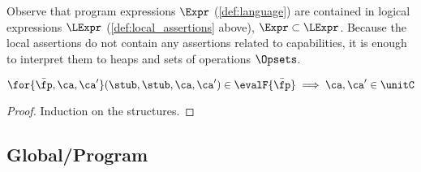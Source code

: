 
Observe that program expressions $\Expr$  (\ref{def:language}) are contained in logical expressions $\LExpr$ (\ref{def:local_assertions} above), \ie $\Expr \subset \LExpr$. 
Because the local assertions do not contain any assertions related to capabilities, it is enough to interpret them to heaps and sets of operations \( \Opsets \).

\begin{lem}
\(
    \for{\bar{\fp},\ca,\ca'} (\stub, \stub, \ca, \ca') \in \evalF{\bar{\fp}} \implies \ca,\ca' \in \unitC
\)
\end{lem}
\begin{proof}
Induction on the structures.
\end{proof}


\subsection{Global/Program}


